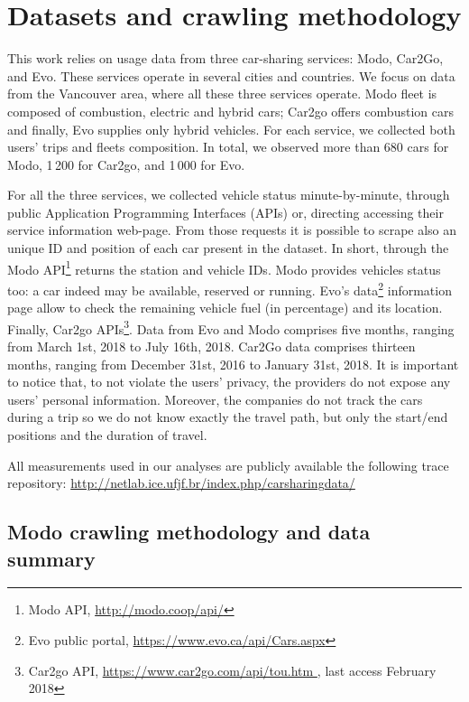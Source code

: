 \section{Datasets and crawling methodology} 
\label{sec:4_3_methodology}

This work relies on usage data from three car-sharing services: Modo, Car2Go, and Evo. These services operate in several cities and countries. We focus on data from the Vancouver area, where all these three services operate. Modo fleet is composed of combustion, electric and hybrid cars; Car2go offers combustion cars and finally, Evo supplies only hybrid vehicles. For each service, we collected both users' trips and fleets composition. In total, we observed more than 680 cars for Modo, 1\,200 for Car2go, and 1\,000 for Evo.

For all the three services, we collected vehicle status minute-by-minute, through public Application Programming Interfaces (APIs) or, directing accessing their service information web-page. From those requests it is possible to scrape also an unique ID and position of each car present in the dataset. In short, through the Modo API\footnote{Modo API, \url{http://modo.coop/api/}} returns the station and vehicle IDs. Modo provides vehicles status too: a car indeed may be available, reserved or running.
Evo's data\footnote{Evo public portal, \url{https://www.evo.ca/api/Cars.aspx}} information page allow to check the remaining vehicle fuel (in percentage) and its location. Finally, Car2go APIs\footnote{Car2go API, \url{https://www.car2go.com/api/tou.htm }, last access February 2018}. 
Data from Evo and Modo comprises five months, ranging from March 1st, 2018 to July 16th, 2018. Car2Go data comprises thirteen months, ranging from  December 31st, 2016 to January 31st, 2018. It is important to notice that, to not violate the users' privacy, the providers do not expose any users' personal information. Moreover, the companies do not track the cars during a trip so we do not know exactly the travel path, but only the start/end positions and the duration of travel.

All measurements used in our analyses are publicly available the following trace repository:
\url{http://netlab.ice.ufjf.br/index.php/carsharingdata/}


\subsection{Modo crawling methodology and data summary}


